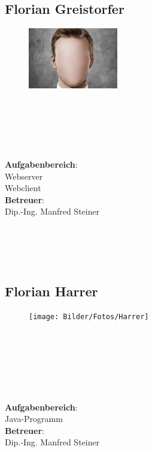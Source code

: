 \subsection*{Florian Greistorfer}
\begin{figure}
\begin{center}
  \includegraphics[width=0.35\textwidth]{Bilder/face.jpg}
\end{center}
\end{figure}
\mbox{}\\
\mbox{}\\
\mbox{}\\
\mbox{}\\
\mbox{}\\
\textbf{Aufgabenbereich}:\\
Webserver\\
Webclient\\
\textbf{Betreuer}:\\
Dip.-Ing. Manfred Steiner
\mbox{}\\
\mbox{}\\
\mbox{}\\
\mbox{}\\
\mbox{}\\

\subsection*{Florian Harrer}
\begin{figure}
\begin{center}
  \texttt{[image: Bilder/Fotos/Harrer]}
\end{center}
\end{figure}
\mbox{}\\
\mbox{}\\
\mbox{}\\
\mbox{}\\
\mbox{}\\
\mbox{}\\
\textbf{Aufgabenbereich}:\\
Java-Programm\\
\textbf{Betreuer}:\\
Dip.-Ing. Manfred Steiner
\mbox{}\\
\mbox{}\\
\mbox{}\\
\mbox{}\\
\mbox{}\\
\newpage

